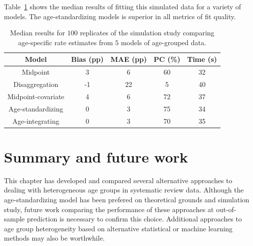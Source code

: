 Table~\ref{age_group_comparison} shows the median results of fitting this simulated data for a variety of models. The age-standardizing models is
superior in all metrics of fit quality.

\begin{table}

\caption{Median results for $100$ replicates of the simulation study
  comparing age-specific rate estimates from $5$ models of age-grouped
  data.}
\label{age_group_comparison}

\begin{center}
\begin{tabular}{|c|c|c|c|c|}
\hline
Model              &Bias (pp)&MAE (pp)&PC (\%)&Time (s)\\
\hline
Midpoint             &     3 &    6 &  60 &  32 \\
Disaggregation       &    -1 &   22 &   5 &  40 \\
Midpoint-covariate   &     4 &    6 &  72 &  37 \\
Age-standardizing    &     0 &    3 &  75 &  34 \\
Age-integrating      &     0 &    3 &  70 &  35 \\
\hline
\end{tabular}
\end{center}
\end{table}

\section{Summary and future work}
This chapter has developed and compared several alternative approaches
to dealing with heterogeneous age groups in systematic review data.
Although the age-standardizing model has been prefered on theoretical
grounds and simulation study, future work comparing the performance of
these approaches at out-of-sample prediction is necessary to confirm
this choice.  Additional approaches to age group heterogeneity based
on alternative statistical or machine learning methods may also be
worthwhile.
